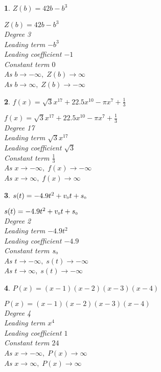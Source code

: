 \documentclass{amsbook}
\newtheorem{exc}{}
\newenvironment{ex}{\begin{exc}\normalfont}{\end{exc}}
\numberwithin{section}{chapter}
\numberwithin{equation}{chapter}
\begin{document}
\begin{multicols}{2}
\begin{ex}
	$Z(b) = 42b - b^{3}$
	\begin{sol}
	$Z(b) = 42b - b^{3}$\\
	Degree 3 \\
	Leading term $-b^{3}$\\
	Leading coefficient $-1$\\
	Constant term $0$\\
	As $b \rightarrow -\infty, \; Z(b) \rightarrow \infty$\\
	As $b \rightarrow \infty, \; Z(b) \rightarrow -\infty$	
	\end{sol}
\end{ex}

\begin{ex}
	$f(x) = \sqrt{3}x^{17} + 22.5x^{10} - \pi x^{7} + \frac{1}{3}$
	\begin{sol}
		$f(x) = \sqrt{3}x^{17} + 22.5x^{10} - \pi x^{7} + \frac{1}{3}$\\
		Degree 17 \\
		Leading term $\sqrt{3}x^{17}$\\
		Leading coefficient $\sqrt{3}$\\
		Constant term $\frac{1}{3}$\\
		As $x \rightarrow -\infty, \; f(x) \rightarrow -\infty$\\
		As $x \rightarrow \infty, \; f(x) \rightarrow \infty$
	\end{sol}
\end{ex}

\begin{ex}
	 $s(t) = -4.9t^{2} + v_{\mbox{\tiny $0$}}t + s_{\mbox{\tiny $0$}}$
	\begin{sol}
		$s(t) = -4.9t^{2} + v_{\mbox{\tiny $0$}}t + s_{\mbox{\tiny $0$}}$\\
		Degree 2 \\
		Leading term $-4.9t^{2}$\\
		Leading coefficient $-4.9$\\
		Constant term $s_{\mbox{\tiny $0$}}$\\
		As $t \rightarrow -\infty, \; s(t) \rightarrow -\infty$\\
		As $t \rightarrow \infty, \; s(t) \rightarrow -\infty$
	\end{sol}
\end{ex}

\begin{ex}
	$P(x) = (x - 1)(x - 2)(x - 3)(x - 4)$
	\begin{sol}
		$P(x) = (x - 1)(x - 2)(x - 3)(x - 4)$\\
		Degree 4 \\
		Leading term $x^{4}$\\
		Leading coefficient $1$\\
		Constant term $24$\\
		As $x \rightarrow -\infty, \; P(x) \rightarrow \infty$\\
		As $x \rightarrow \infty, \; P(x) \rightarrow \infty$
	\end{sol}
\end{ex}


\end{multicols}
\end{document}
